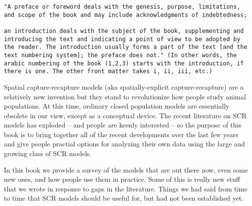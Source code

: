 \begin{verbatim}
"A preface or foreword deals with the genesis, purpose, limitations,
and scope of the book and may include acknowledgments of indebtedness;

an introduction deals with the subject of the book, supplementing and
introducing the text and indicating a point of view to be adopted by
the reader. The introduction usually forms a part of the text [and the
text numbering system]; the preface does not." (In other words, the
arabic numbering of the book (1,2,3) starts with the introduction, if
there is one. The other front matter takes i, ii, iii, etc.)
\end{verbatim}


Spatial capture-recapture models (aka spatially-explicit
capture-recapture) are a relatively new invention but they stand to
revolutionize how people study animal populations.
At this time, ordinary closed population models are essentially
obsolete in our view, except as a conceptual device. The recent
literature on SCR models has exploded -- and people are keenly
interested -- so the purpose of this book is to bring together all of
the recent developments over the last few years and give people
practial options for analyzing their own data using the large and
growing class of SCR models.

In this book we provide a survey of the models that are out there now,
even some new ones, and how people use them in practice. Some of this
is really new stuff that we wrote in response to gaps in the
literature. Things we had said from time to time that SCR models
should be useful for, but had not been established yet.

